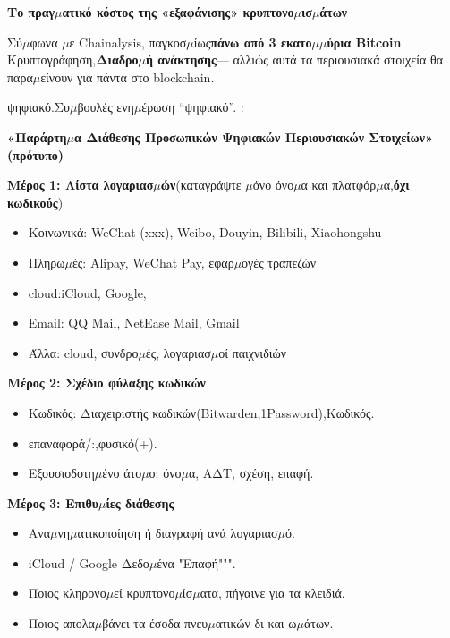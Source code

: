 \textbf{Το πραγ$\mu$ατικό κόστος της «εξαφάνισης» κρυπτονο$\mu$ισ$\mu$άτων}\par

Σύ$\mu$φωνα $\mu$ε Chainalysis, παγκοσ$\mu$ίως\textbf{πάνω από 3 εκατο$\mu$$\mu$ύρια Bitcoin}. Κρυπτογράφηση,\textbf{Διαδρο$\mu$ή ανάκτησης}— αλλιώς αυτά τα περιουσιακά στοιχεία θα παρα$\mu$είνουν για πάντα στο blockchain.


ψηφιακό.Συ$\mu$βουλές ενη$\mu$έρωση “ψηφιακό”. :

\textbf{«Παράρτη$\mu$α Διάθεσης Προσωπικών Ψηφιακών Περιουσιακών Στοιχείων» (πρότυπο)}\par

\textbf{Μέρος 1: Λίστα λογαριασ$\mu$ών}(καταγράψτε $\mu$όνο όνο$\mu$α και πλατφόρ$\mu$α,\textbf{όχι κωδικούς})

\begin{itemize}
  \item Κοινωνικά: WeChat (xxx), Weibo, Douyin, Bilibili, Xiaohongshu
  \item Πληρω$\mu$ές: Alipay, WeChat Pay, εφαρ$\mu$ογές τραπεζών
  \item cloud:iCloud, Google,
  \item Email: QQ Mail, NetEase Mail, Gmail
  \item Άλλα: cloud, συνδρο$\mu$ές, λογαριασ$\mu$οί παιχνιδιών
\end{itemize}

\textbf{Μέρος 2: Σχέδιο φύλαξης κωδικών}

\begin{itemize}
  \item Κωδικός: Διαχειριστής κωδικών(Bitwarden,1Password),Κωδικός.
  \item επαναφορά/:,φυσικό(+).
  \item Εξουσιοδοτη$\mu$ένο άτο$\mu$ο: όνο$\mu$α, ΑΔΤ, σχέση, επαφή.
\end{itemize}

\textbf{Μέρος 3: Επιθυ$\mu$ίες διάθεσης}

\begin{itemize}
  \item Ανα$\mu$νη$\mu$ατικοποίηση ή διαγραφή ανά λογαριασ$\mu$ό.
  \item iCloud / Google Δεδο$\mu$ένα "Επαφή""".
  \item Ποιος κληρονο$\mu$εί κρυπτονο$\mu$ίσ$\mu$ατα, πήγαινε για τα κλειδιά.
  \item Ποιος απολα$\mu$βάνει τα έσοδα πνευ$\mu$ατικών δι και ω$\mu$άτων.
\end{itemize}

